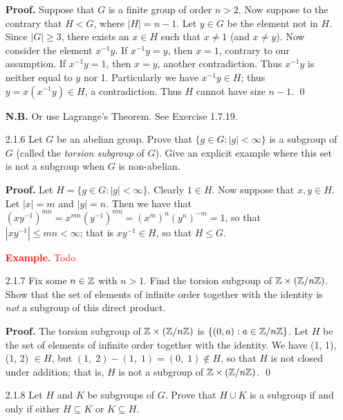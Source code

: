 \begin{enumerate}
      \textbf{Proof.} Suppose that $G$ is a finite group of order $n > 2$. Now
      suppose to the contrary that $H < G$, where $|H| = n - 1$. Let $y \in G$
      be the element not in $H$. Since $|G| \ge 3$, there exists an
      $x \in H$ such that $x \neq 1$ (and $x \neq y$). Now consider the element
      $x^{-1}y$. If $x^{-1}y = y$, then $x = 1$, contrary to our assumption. If
      $x^{-1}y = 1$, then $x = y$, another contradiction. Thus $x^{-1}y$ is
      neither equal to $y$ nor 1. Particularly we have $x^{-1}y \in H$; thus
      $y = x(x^{-1}y) \in H$, a contradiction. Thus $H$ cannot have size
      $n - 1$. \qed

      \textbf{N.B.} Or use Lagrange's Theorem. See Exercise 1.7.19.
   \item[2.1.6]   Let $G$ be an abelian group. Prove that
                  $\{g \in G : |g| < \infty\}$ is a subgroup of $G$ (called the
                  \textit{torsion subgroup} of $G$). Give an explicit example
                  where this set is not a subgroup when $G$ is non-abelian.

      \textbf{Proof.} Let $H = \{g \in G : |g| < \infty\}$. Clearly $1 \in H$.
      Now suppose that $x, y \in H$. Let $|x| = m$ and $|y| = n$. Then we have
      that $(xy^{-1})^{mn} = x^{mn}(y^{-1})^{mn} = (x^m)^n(y^n)^{-m} = 1$, so 
      that $|xy^{-1}| \le mn < \infty$; that is $xy^{-1} \in H$, so that
      $H \le G$.

      \textcolor{red}{\textbf{Example.} Todo}
   \item[2.1.7]   Fix some $n \in \mathbb{Z}$ with $n > 1$. Find the torsion subgroup
                  of $\mathbb{Z} \times (\mathbb{Z}/n\mathbb{Z})$. Show that the set of elements of
                  infinite order together with the identity is \textit{not} a
                  subgroup of this direct product.

      \textbf{Proof.} The torsion subgroup of $\mathbb{Z} \times (\mathbb{Z}/n\mathbb{Z})$ is
      $\{(0, a) : a \in \mathbb{Z}/n\mathbb{Z}\}$. Let $H$ be the set of elements of infinite 
      order together with the identity. We have (1, 1), (1, 2) $\in H$, but
      $(1,\;2) - (1,\;1) = (0,\;1) \notin H$, so that $H$ is not closed under
      addition; that is, $H$ is not a subgroup of $\mathbb{Z} \times (\mathbb{Z}/n\mathbb{Z})$. \qed
   \item[2.1.8]   Let $H$ and $K$ be subgroups of $G$. Prove that $H \cup K$ is
                  a subgroup if and only if either $H \subseteq K$ or
                  $K \subseteq H$.


\end{enumerate}
